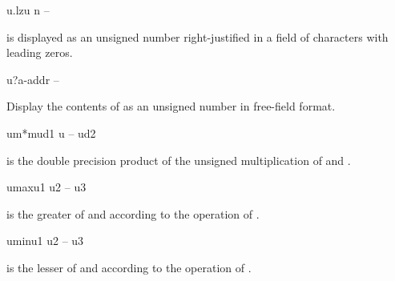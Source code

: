\begin{gloss}{u.lz}{u n -- }

 is displayed as an unsigned number right-justified in a field
of  characters with leading zeros.
\end{gloss}
\begin{gloss}{u?}{a-addr -- }

Display the contents of  as an unsigned number
in free-field format.
\end{gloss}
\begin{gloss}{um*m}{ud1 u -- ud2}

 is the double precision product of the unsigned multiplication
of  and .
\end{gloss}
\begin{gloss}{umax}{u1 u2 -- u3}

 is the greater of  and 
according to the operation of .
\end{gloss}
\begin{gloss}{umin}{u1 u2 -- u3}

 is the lesser of  and 
according to the operation of .
\end{gloss}

